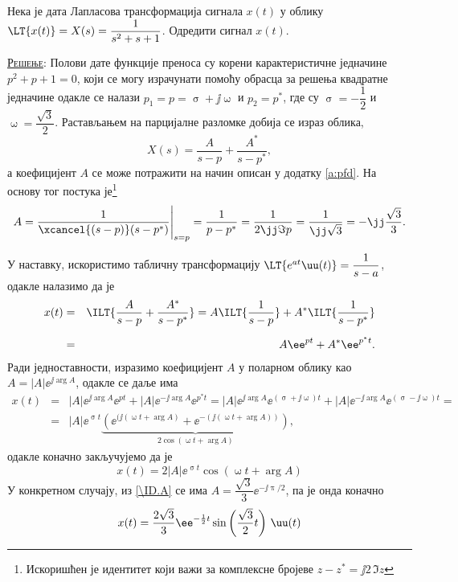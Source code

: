\PID
Нека је дата Лапласова трансформација сигнала $x(t)$ у облику $\LT{x(t)} = X(s) = \dfrac{1}{s^2 + s + 1}$. Одредити 
сигнал $x(t)$. 

\textsc{\underline{Решење}}: Полови дате функције преноса су корени карактеристичне једначине 
$p^2 + p + 1 = 0$, који се могу израчунати помоћу обрасца за решења квадратне једначине одакле се налази
$p_{1} = p = \upsigma + \jj\upomega$ и $p_2 = p^\ast$, где су $\upsigma = -\dfrac12$ и $ \upomega = \dfrac{\sqrt{3}}{2}$. 
Растављањем на парцијалне разломке добија се израз облика,
\begin{equation}
    X(s) = \dfrac{A}{s - p} + \dfrac{A^\ast}{s - p^\ast},
\end{equation}
а коефицијент $A$ се може потражити на начин описан у додатку \ref{a:pfd}. На основу тог постука 
је\footnote{Искоришћен је идентитет који важи за комплексне бројеве 
$z - z^\ast = \jj 2 \, \Im{z}$} 
\begin{equation}
    A = \dfrac{1}{\xcancel{(s - p)}(s - p^\ast)} \Bigg|_{s = p} 
      = \dfrac{1}{p - p^\ast} = \dfrac{1}{2 \jj \Im{p} } = \dfrac{1}{\jj\sqrt{3}} = -\jj \dfrac{\sqrt{3}}{3}. \label{\ID.A}
\end{equation}

У наставку, искористимо табличну трансформацију $\LT{e^{at}\uu(t)} = \dfrac{1}{s - a}$, одакле налазимо да је 
\begin{eqnarray}
x(t) &=& \ILT{ \dfrac{A}{s - p} + \dfrac{A^\ast}{s - p^\ast} } = 
       A \ILT{ \dfrac{1}{s - p}} + A^\ast \ILT{ \dfrac{1}{s - p^{\ast}}}  \\[2mm]
     &=&
     A \ee^{pt} + A^* \ee^{p^\ast t}.
\end{eqnarray}
Ради једноставности, изразимо коефицијент $A$ у поларном облику као $A = |A| \ee^{\jj\arg{A}}$, одакле се даље има
\begin{eqnarray}
    x(t) &=&
    |A| \ee^{\jj \arg{A}} \ee^{pt} + |A| \ee^{-\jj \arg{A}} \ee^{p^\ast t} = 
    |A| \ee^{\jj \arg{A}} \ee^{(\upsigma + \jj\upomega)t} + |A| \ee^{-\jj \arg{A}} \ee^{(\upsigma - \jj\upomega) t} = \\
    &=&
    |A| \ee^{\upsigma t} 
    \underbrace{
    \left( 
        \ee^{(\jj(\upomega t + \arg A) } + \ee^{ -(\jj(\upomega t + \arg A)) } 
    \right)}_{ 2\cos(\upomega t + \arg A) },
\end{eqnarray}
одакле коначно закључујемо да је 
\begin{equation}
    x(t) = 2|A| \ee^{\upsigma t} \cos(\upomega t + \arg A)
\end{equation}
У конкретном случају, из \eqref{\ID.A} се има $A = \dfrac{\sqrt 3}{3} \ee^{-\jj\uppi/2}$, па је онда коначно
\begin{equation}
    x(t) = \dfrac{2\sqrt 3}{3} \ee^{-\frac{1}{2}t} \sin \left(\dfrac{\sqrt 3}{2} t\right) \, \uu(t)
\end{equation}